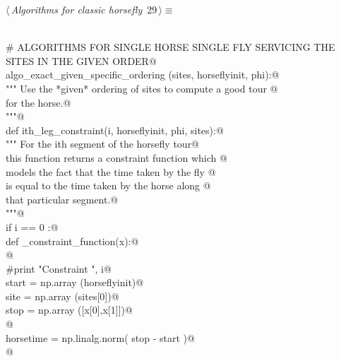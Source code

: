 \documentclass[11.5pt]{report}
\begin{document}
\newchunk 

\begin{flushleft} \small\label{scrap36}\raggedright\small
{} $\langle\,${\itshape Algorithms for classic horsefly}\nobreak\ {\footnotesize {29}}$\,\rangle\equiv$
\vspace{-1ex}
\begin{list}{}{} \item
\mbox{}\verb@@\\
\mbox{}\verb@# ALGORITHMS FOR SINGLE HORSE SINGLE FLY SERVICING THE SITES IN THE GIVEN ORDER@\\
\mbox{}\verb@def algo_exact_given_specific_ordering (sites, horseflyinit, phi):@\\
\mbox{}\verb@    """ Use the *given* ordering of sites to compute a good tour @\\
\mbox{}\verb@    for the horse.@\\
\mbox{}\verb@    """@\\
\mbox{}\verb@    def ith_leg_constraint(i, horseflyinit, phi, sites):@\\
\mbox{}\verb@        """ For the ith segment of the horsefly tour@\\
\mbox{}\verb@        this function returns a constraint function which @\\
\mbox{}\verb@        models the fact that the time taken by the fly @\\
\mbox{}\verb@        is equal to the time taken by the horse along @\\
\mbox{}\verb@        that particular segment.@\\
\mbox{}\verb@        """@\\
\mbox{}\verb@        if i == 0 :@\\
\mbox{}\verb@            def _constraint_function(x):@\\
\mbox{}\verb@            @\\
\mbox{}\verb@                #print "Constraint  ", i@\\
\mbox{}\verb@                start = np.array (horseflyinit)@\\
\mbox{}\verb@                site  = np.array (sites[0])@\\
\mbox{}\verb@                stop  = np.array ([x[0],x[1]])@\\
\mbox{}\verb@            @\\
\mbox{}\verb@                horsetime = np.linalg.norm( stop - start )@\\
\mbox{}\verb@            @\\

\end{list}
\end{flushleft}
\end{document}
